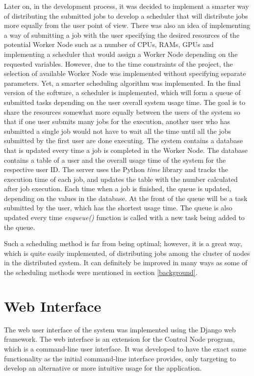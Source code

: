 \documentclass[10pt]{report}
\begin{document}
Later on, in the development process, it was decided to implement a smarter way of distributing the submitted jobs to develop a scheduler that will distribute jobs more equally from the user point of view. There was also an idea of implementing a way of submitting a job with the user specifying the desired resources of the potential Worker Node such as a number of CPUs, RAMs, GPUs and implementing a scheduler that would assign a Worker Node depending on the requested variables. However, due to the time constraints of the project, the selection of available Worker Node was implemented without specifying separate parameters. Yet, a smarter scheduling algorithm was implemented. In the final version of the software, a scheduler is implemented, which will form a queue of submitted tasks depending on the user overall system usage time. The goal is to share the resources somewhat more equally between the users of the system so that if one user submits many jobs for the execution, another user who has submitted a single job would not have to wait all the time until all the jobs submitted by the first user are done executing. The system contains a database that is updated every time a job is completed in the Worker Node. The database contains a table of a user and the overall usage time of the system for the respective user ID. The server uses the Python \textit{time} library and tracks the execution time of each job, and updates the table with the number calculated after job execution. Each time when a job is finished, the queue is updated, depending on the values in the database. At the front of the queue will be a task submitted by the user, which has the shortest usage time. The queue is also updated every time \textit{enqueue()} function is called with a new task being added to the queue.
\newline

Such a scheduling method is far from being optimal; however, it is a great way, which is quite easily implemented, of distributing jobs among the cluster of nodes in the distributed system. It can definitely be improved in many ways as some of the scheduling methods were mentioned in section \ref{background}.

\section{Web Interface}

The web user interface of the system was implemented using the Django web framework. The web interface is an extension for the Control Node program, which is a command-line user interface. It was developed to have the exact same functionality as the initial command-line interface provides, only targeting to develop an alternative or more intuitive usage for the application.
\newline
\end{document}
